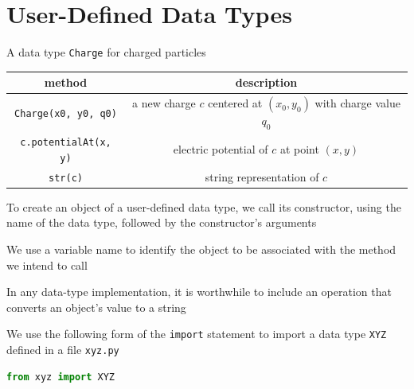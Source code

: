 \documentclass[8pt,a4paper,compress]{beamer}
\begin{document}
\section{User-Defined Data Types}
\begin{frame}[fragile]
\pause

A data type \lstinline{Charge} for charged particles
\begin{center}
\begin{tabular}{cc}
method & description \\ \hline
\lstinline$Charge(x0, y0, q0)$ & a new charge $c$ centered at $(x_0, y_0)$ with charge value $q_0$ \\
\lstinline$c.potentialAt(x, y)$ & electric potential of $c$ at point $(x, y)$ \\
\lstinline$str(c)$ & string representation of $c$
\end{tabular} 
\end{center}

\pause
\bigskip

To create an object of a user-defined data type, we call its constructor, using the name of the data type, followed by the constructor's arguments

\pause
\bigskip

We use a variable name to identify the object to be associated with the method we intend to call

\pause
\bigskip

In any data-type implementation, it is worthwhile to include an operation that converts an object's value to a string

\pause
\bigskip

We use the following form of the \lstinline{import} statement to import a data type \lstinline{XYZ} defined in a file \lstinline{xyz.py}

\smallskip

\begin{lstlisting}[language=python,style=focusin]
from xyz import XYZ
\end{lstlisting}
\end{frame}
\end{document}

